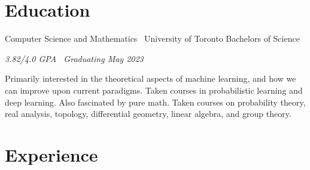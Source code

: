\documentclass[]{style}
\begin{document}
\section{Education}

\begin{entrylist}


\entry
{Computer Science and Mathematics \ {\normalfont University of Toronto}}
{Bachelors of Science}
{\emph{3.82/4.0 GPA \ Graduating May 2023}
~ \vspace{1mm}

Primarily interested in the theoretical aspects of machine learning, and how we can improve upon current paradigms. Taken courses in probabilistic learning and deep learning. Also fascinated by pure math. Taken courses on probability theory, real analysis, topology, differential geometry, linear algebra, and group theory. }


\end{entrylist}


\section{Experience}
\end{document}
